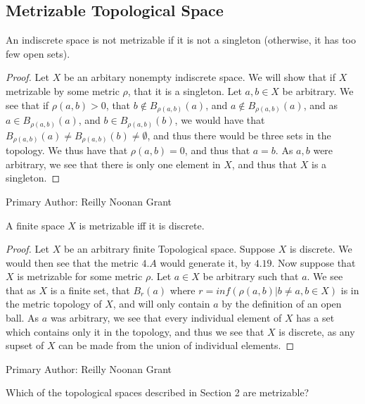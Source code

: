 \subsection{Metrizable Topological Space}

\begin{majorEx}%
    An indiscrete space is not metrizable if it is not a singleton (otherwise,
    it has too few open sets).
\end{majorEx}

\begin{proof}
   Let $X$ be an arbitary nonempty indiscrete space.
   We will show that if $X$ metrizable by some metric $\rho$, that it
   is a singleton. Let $a,b \in X$ be arbitrary. We see that if
   $\rho(a,b)>0$, that $b \notin B_{\rho(a,b)}(a)$, and $a \notin
   B_{\rho(a,b)}(a)$, and as $a \in B_{\rho(a,b)}(a)$, and $b \in
   B_{\rho(a,b)}(b)$, we would have that $B_{\rho(a,b)}(a)\neq
   B_{\rho(a,b)}(b)\neq \emptyset$, and thus there would be three sets
   in the topology. We thus have that $\rho(a,b)=0$, and thus that
   $a=b$. As $a,b$ were arbitrary, we see that there is only one
   element in $X$, and thus that $X$ is a singleton.
\end{proof}
Primary Author: Reilly Noonan Grant

\begin{majorEx}%
    A finite space $X$ is metrizable iff it is discrete.
\end{majorEx}

\begin{proof}
  Let $X$ be an arbitrary finite Topological space. Suppose $X$ is
  discrete. We would then see that the metric $4.A$ would generate it,
  by $4.19$. Now suppose that $X$ is metrizable for some metric
  $\rho$. Let $a\in X$ be 
  arbitrary such that $a$. We see that as $X$ is a finite set, that
  $B_r(a)$ where $r = inf (\rho(a,b)| b\neq a, b\in X )$ is in the
  metric topology of $X$, and will only contain $a$ by the definition
  of an open ball. As $a$ was arbitrary, we see that every individual
  element of $X$ has a set which contains only it in the topology, and
  thus we see that $X$ is discrete, as any supset of $X$ can be made
  from the union of individual elements.
\end{proof}
Primary Author: Reilly Noonan Grant


\begin{minorEx}%
    Which of the topological spaces described in Section 2 are metrizable?
\end{minorEx}



